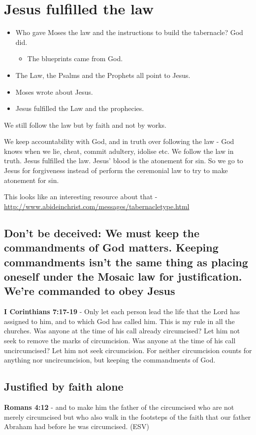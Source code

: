 \documentclass[11pt]{article}
\begin{document}
\section{Jesus fulfilled the law}
\label{sec:org5b5dbf6}
\begin{itemize}
\item Who gave Moses the law and the instructions to build the tabernacle? God did.
\begin{itemize}
\item The blueprints came from God.
\end{itemize}
\item The Law, the Psalms and the Prophets all point to Jesus.
\item Moses wrote about Jesus.
\item Jesus fulfilled the Law and the prophecies.
\end{itemize}

We still follow the law but by faith and not by works.

We keep accountability with God, and in truth over following the law - God knows when we lie, cheat, commit adultery, idolise etc.
We follow the law in truth.
Jesus fulfilled the law. Jesus' blood is the atonement for sin.
So we go to Jesus for forgiveness instead of perform the ceremonial law to try to make atonement for sin.

This looks like an interesting resource about that - \url{http://www.abideinchrist.com/messages/tabernacletype.html}

\subsection{Don't be deceived: We must keep the commandments of God matters. Keeping commandments isn't the same thing as placing oneself under the Mosaic law for justification. We're commanded to obey Jesus}
\label{sec:org6f71239}
\textbf{I Corinthians 7:17-19} - Only let each person lead the life that the Lord has assigned to him, and to which God has called him. This is my rule in all the churches. Was anyone at the time of his call already circumcised? Let him not seek to remove the marks of circumcision. Was anyone at the time of his call uncircumcised? Let him not seek circumcision. For neither circumcision counts for anything nor uncircumcision, but keeping the commandments of God.

\subsection{Justified by faith alone}
\label{sec:org8d9d418}
\textbf{Romans 4:12} -  and to make him the father of the circumcised who are not merely circumcised but who also walk in the footsteps of the faith that our father Abraham had before he was circumcised.  (ESV)
\end{document}

